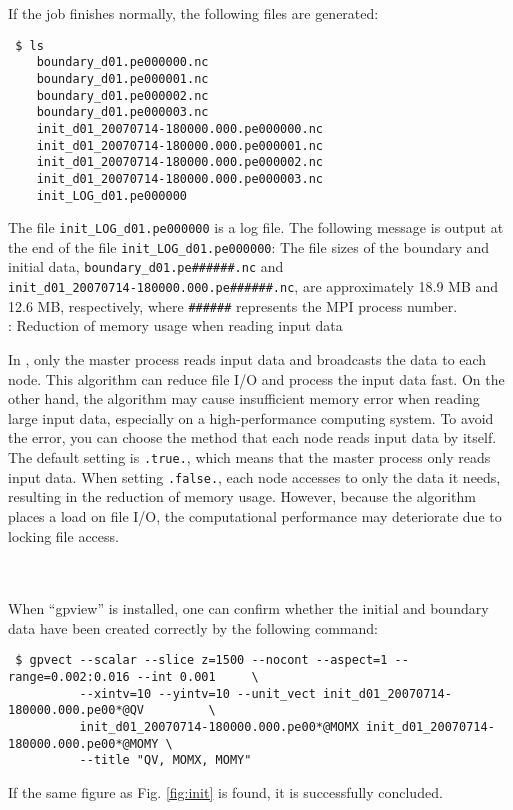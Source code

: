If the job finishes normally, the following files are generated:
\begin{verbatim}
 $ ls
    boundary_d01.pe000000.nc
    boundary_d01.pe000001.nc
    boundary_d01.pe000002.nc
    boundary_d01.pe000003.nc
    init_d01_20070714-180000.000.pe000000.nc
    init_d01_20070714-180000.000.pe000001.nc
    init_d01_20070714-180000.000.pe000002.nc
    init_d01_20070714-180000.000.pe000003.nc
    init_LOG_d01.pe000000
\end{verbatim}
The file \verb|init_LOG_d01.pe000000| is a log file.  The following message is output at the end of the file \verb|init_LOG_d01.pe000000|:
The file sizes of the boundary and initial data, \verb|boundary_d01.pe######.nc| and \\
\verb|init_d01_20070714-180000.000.pe######.nc|, are approximately 18.9 MB and 12.6 MB, respectively,  where \verb|######| represents the MPI process number.\\

\vspace{0.8cm}
: {\large Reduction of memory usage when reading input data} \hrulefill

In \scalerm, only the master process reads input data and broadcasts the data to each node.
This algorithm can reduce file I/O and process the input data fast.
On the other hand, the algorithm may cause insufficient memory error when reading large input data, especially on a high-performance computing system.
To avoid the error, you can choose the method that each node reads input data by itself.
%
%
The default setting is \verb|.true.|, which means that the master process only reads input data.
When setting \verb|.false.|, each node accesses to only the data it needs, resulting in the reduction of memory usage.
However, because the algorithm places a load on file I/O,
the computational performance may deteriorate due to locking file access.

\noindent \hrulefill\\

\vspace{0.8cm}
 \hrulefill \\
When ``gpview'' is installed,  one can confirm whether the initial and boundary data have been created correctly  by the following command:
\begin{verbatim}
 $ gpvect --scalar --slice z=1500 --nocont --aspect=1 --range=0.002:0.016 --int 0.001     \
          --xintv=10 --yintv=10 --unit_vect init_d01_20070714-180000.000.pe00*@QV         \
          init_d01_20070714-180000.000.pe00*@MOMX init_d01_20070714-180000.000.pe00*@MOMY \
          --title "QV, MOMX, MOMY"
\end{verbatim}
If the same figure as Fig. \ref{fig:init} is found, it is successfully concluded.

